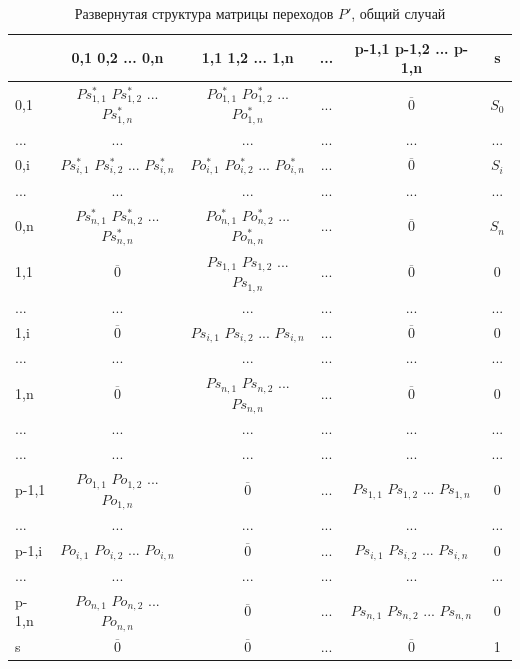 \newpage 
\begin{table}[h]
	\centering
	\caption{Развернутая структура матрицы переходов $P'$,\newline
		общий случай}
	\begin{tabular}{l || c | c | c | c | c}
		& 0,1 0,2 ... 0,n & 1,1 1,2 ... 1,n & ... & p-1,1 p-1,2 ... p-1,n & s \\
		\hline \hline
		0,1 & $Ps^*_{1,1}$ $Ps^*_{1,2}$ ... $Ps^*_{1,n}$ & $Po^*_{1,1}$ $Po^*_{1,2}$ ... $Po^*_{1,n}$ & ... & $\overline 0$ & $S_0$ \\
		... & ... & ... & ... & ... & ... \\
		0,i & $Ps^*_{i,1}$ $Ps^*_{i,2}$ ... $Ps^*_{i,n}$ & $Po^*_{i,1}$ $Po^*_{i,2}$ ... $Po^*_{i,n}$ & ... & $\overline 0$ & $S_i$ \\
		... & ... & ... & ... & ... & ... \\
		0,n & $Ps^*_{n,1}$ $Ps^*_{n,2}$ ... $Ps^*_{n,n}$ & $Po^*_{n,1}$ $Po^*_{n,2}$ ... $Po^*_{n,n}$ & ... & $\overline 0$ & $S_n$ \\
		\hline \hline
		1,1 & $\overline 0$ & $Ps_{1,1}$ $Ps_{1,2}$ ... $Ps_{1,n}$ & ... & $\overline 0$ & 0 \\
		... & ... & ... & ... & ... & ... \\
		1,i & $\overline 0$ & $Ps_{i,1}$ $Ps_{i,2}$ ... $Ps_{i,n}$ & ... & $\overline 0$ & 0 \\
		... & ... & ... & ... & ... & ... \\
		1,n & $\overline 0$ & $Ps_{n,1}$ $Ps_{n,2}$ ... $Ps_{n,n}$ & ... & $\overline 0$ & 0 \\
		\hline \hline
		... & ... & ... & ... & ... & ... \\
		... & ... & ... & ... & ... & ... \\
		\hline \hline
		p-1,1  & $Po_{1,1}$ $Po_{1,2}$ ... $Po_{1,n}$ & $\overline 0$ & ... & $Ps_{1,1}$ $Ps_{1,2}$ ... $Ps_{1,n}$ & 0 \\
		... & ... & ... & ... & ... & ... \\
		p-1,i & $Po_{i,1}$ $Po_{i,2}$ ... $Po_{i,n}$ & $\overline 0$ & ... & $Ps_{i,1}$ $Ps_{i,2}$ ... $Ps_{i,n}$ & 0 \\
		... & ... & ... & ... & ... & ... \\
		p-1,n & $Po_{n,1}$ $Po_{n,2}$ ... $Po_{n,n}$ & $\overline 0$ & ... & $Ps_{n,1}$ $Ps_{n,2}$ ... $Ps_{n,n}$ & 0 \\
		\hline \hline
		s  & $\overline 0$ & $\overline 0$ & ... & $\overline 0$ & 1 \\
	\end{tabular}
	\label{tabl:comP'}
\end{table}

